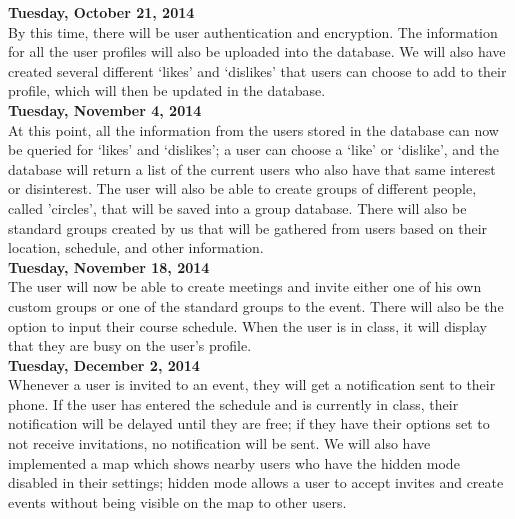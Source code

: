 \documentclass[11pt]{article}
\begin{document}
\textbf{Tuesday, October 21, 2014}
\\	\indent By this time, there will be user authentication and encryption. The 
    information for all the user profiles will also be uploaded into the 
    database. We will also have created several different `likes' and `dislikes'
    that users can choose to add to their profile, which will then be updated 
    in the database.\\

\textbf{Tuesday, November 4, 2014}
\\	\indent At this point, all the information from the users stored in the database 
    can now be queried for `likes' and `dislikes'; a user can choose a `like' 
    or `dislike', and the database will return a list of the current users who
    also have that same interest or disinterest. The user will also be able to
    create groups of different people, called 'circles', that will be saved 
    into a group database. There will also be standard groups created by us 
    that will be gathered from users based on their location, schedule, and 
    other information.\\

\textbf{Tuesday, November 18, 2014}
\\	\indent The user will now be able to create meetings and invite either one of his
    own custom groups or one of the standard groups to the event. There will
    also be the option to input their course schedule. When the user is in
    class, it will display that they are busy on the user's profile.\\

\textbf{Tuesday, December 2, 2014}
\\	\indent Whenever a user is invited to an event, they will get a notification sent 
    to their phone. If the user has entered the schedule and is currently in 
    class, their notification will be delayed until they are free; if they have
    their options set to not receive invitations, no notification will be sent.
    We will also have implemented a map which shows nearby users who have the
    hidden mode disabled in their settings; hidden mode allows a user to accept
    invites and create events without being visible on the map to other users.\\

\newpage


\nocite{}
\end{document}

